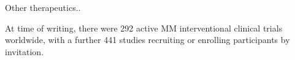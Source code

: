 Other therapeutics..

At time of writing, there were 292 active MM interventional clinical trials worldwide, with a further 441 studies recruiting or enrolling participants by invitation\cite{clinicaltrialsgov}.









